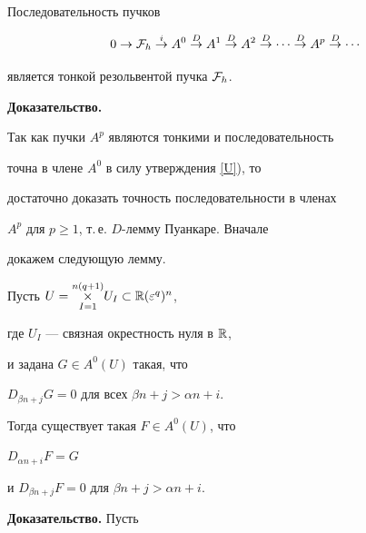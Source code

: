 \begin{assrt}


Последовательность пучков


$$


0 \to {\cal F}_{h} \overset{i}{\to} A^{0}


\overset{D}{\to} A^{1}


\overset{D}{\to} A^{2}


\overset{D}{\to} \dotsb


\overset{D}{\to}  A^{p}


\overset{D}{\to} \dotsb


$$


является тонкой резольвентой пучка ${\cal F}_h$.


\end{assrt}





{\bf Доказательство.}


Так как пучки $A^p$ являются тонкими и последовательность


точна в члене $A^0$ в силу утверждения \ref{U}), то


достаточно доказать точность последовательности в членах


$A^{p}$ для $ p \ge 1$, т.\,е. $D$-лемму Пуанкаре. Вначале


докажем следующую лемму.





\begin{lemnonum}


Пусть $U=\overset{{n(q+1)}}{\underset{I=1}{\times}}U_I \subset \Bbb R(\varepsilon^q)^n$,


где $U_I$ --- связная окрестность нуля в $\Bbb R$,


и задана $G \in A^0(U)$ такая, что


$D_{\beta n + j}G = 0$ для всех $\beta n + j > \alpha n + i$.





Тогда существует такая $F \in A^0(U)$, что


$D_{\alpha n + i}F = G$


и $D_{\beta n + j}F = 0$ для $\beta n + j > \alpha n + i$.


\end{lemnonum}





{\bf Доказательство.} Пусть


